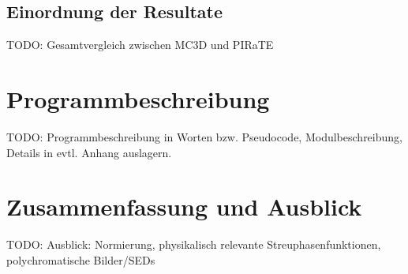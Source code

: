 \documentclass[
	12pt,
	a4paper,
	DIVcalc,
	titlepage,
	twoside,
	liststotoc,
	bibtotocnumbered
]{scrbook}
\begin{document}
	\section{Einordnung der Resultate}
	TODO: Gesamtvergleich zwischen MC3D und PIRaTE
	
	\chapter{Programmbeschreibung}
	TODO: Programmbeschreibung in Worten bzw. Pseudocode, Modulbeschreibung, Details in evtl. Anhang auslagern.
	
	\chapter{Zusammenfassung und Ausblick}
	TODO: Ausblick: Normierung, physikalisch relevante Streuphasenfunktionen, polychromatische Bilder/SEDs

\backmatter
	
	
\end{document}
